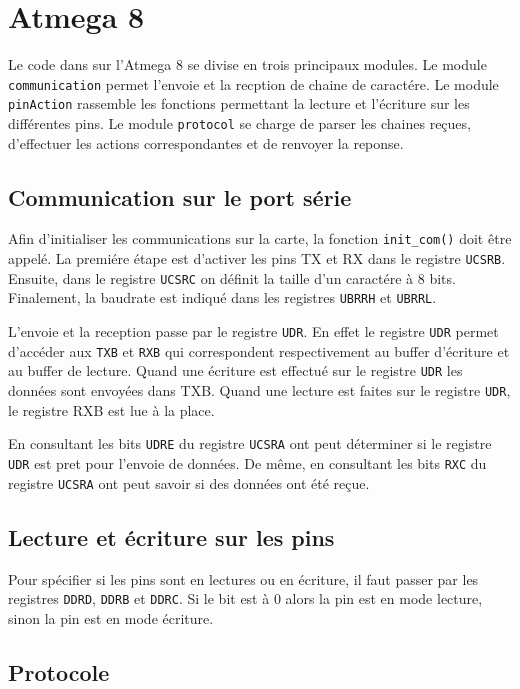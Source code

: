\section{Atmega 8}
Le code dans sur l'Atmega 8 se divise en trois principaux modules.
Le module \texttt{communication} permet l'envoie et la recption de chaine de caractére.
Le module \texttt{pinAction} rassemble les fonctions permettant la lecture et l'écriture sur les différentes pins.
Le module \texttt{protocol} se charge de parser les chaines reçues, d'effectuer les actions correspondantes et de renvoyer la reponse.

\subsection{Communication sur le port série}
Afin d'initialiser les communications sur la carte, la fonction \texttt{init\_com()} doit être appelé.
La premiére étape est d'activer les pins TX et RX dans le registre \texttt{UCSRB}.
Ensuite, dans le registre \texttt{UCSRC} on définit la taille d'un caractére à 8 bits.
Finalement, la baudrate est indiqué dans les registres \texttt{UBRRH} et \texttt{UBRRL}.

L'envoie et la reception passe par le registre \texttt{UDR}.
En effet le registre \texttt{UDR} permet d'accéder aux \texttt{TXB} et \texttt{RXB} qui correspondent respectivement au buffer d'écriture et au buffer de lecture.
Quand une écriture est effectué sur le registre \texttt{UDR} les données sont envoyées dans TXB.
Quand une lecture est faites sur le registre \texttt{UDR}, le registre RXB est lue à la place.

En consultant les bits \texttt{UDRE} du registre \texttt{UCSRA} ont peut déterminer si le registre \texttt{UDR} est pret pour l'envoie de données.
De même, en consultant les bits \texttt{RXC} du registre \texttt{UCSRA} ont peut savoir si des données ont été reçue.

\subsection{Lecture et écriture sur les pins}
Pour spécifier si les pins sont en lectures ou en écriture, il faut passer par les registres \texttt{DDRD}, \texttt{DDRB} et \texttt{DDRC}.
Si le bit est à 0 alors la pin est en mode lecture, sinon la pin est en mode écriture.


\subsection{Protocole}

